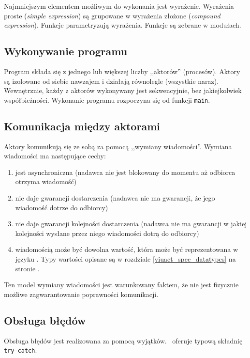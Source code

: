 Najmniejszym elementem możliwym do wykonania jest wyrażenie.
Wyrażenia proste (\emph{simple expression}) są grupowane w wyrażenia złożone (\emph{compound expression}).
Funkcje parametryzują wyrażenia.
Funkcje są zebrane w modułach.

\subsection{Wykonywanie programu}

Program składa się z jednego lub większej liczby ,,aktorów'' (procesów).
Aktory są izolowane od siebie nawzajem i działają równolegle (wszystkie naraz).
Wewnętrznie, każdy z aktorów wykonywany jest sekwencyjnie, bez jakiejkolwiek
współbieżności.
Wykonanie programu rozpoczyna się od funkcji \texttt{main}.

\subsection{Komunikacja między aktorami}

Aktory komunikują się ze sobą za pomocą ,,wymiany wiadomości''. Wymiana
wiadomości ma następujące cechy:

\begin{enumerate}
    \item jest asynchroniczna (nadawca nie jest blokowany do momentu aż odbiorca otrzyma
        wiadomość)
    \item nie daje gwarancji dostarczenia (nadawca nie ma gwarancji, że jego wiadomość
        dotrze do odbiorcy)
    \item nie daje gwarancji kolejności dostarczenia (nadawca nie ma gwarancji w jakiej
        kolejności wysłane przez niego wiadomości dotrą do odbiorcy)
    \item wiadomością może być dowolna wartość, która może być reprezentowana w
        języku \ViuAct. Typy wartości opisane są w rozdziale
        \ref{viuact_spec_datatypes} na stronie \pageref{viuact_spec_datatypes}.
\end{enumerate}

Ten model wymiany wiadomości jest warunkowany faktem, że nie jest fizycznie
możliwe zagwarantowanie poprawności komunikacji.

\subsection{Obsługa błędów}

Obsługa błędów jest realizowana za pomocą wyjątków. \ViuAct\ oferuje typową
składnię \texttt{try-catch}.

